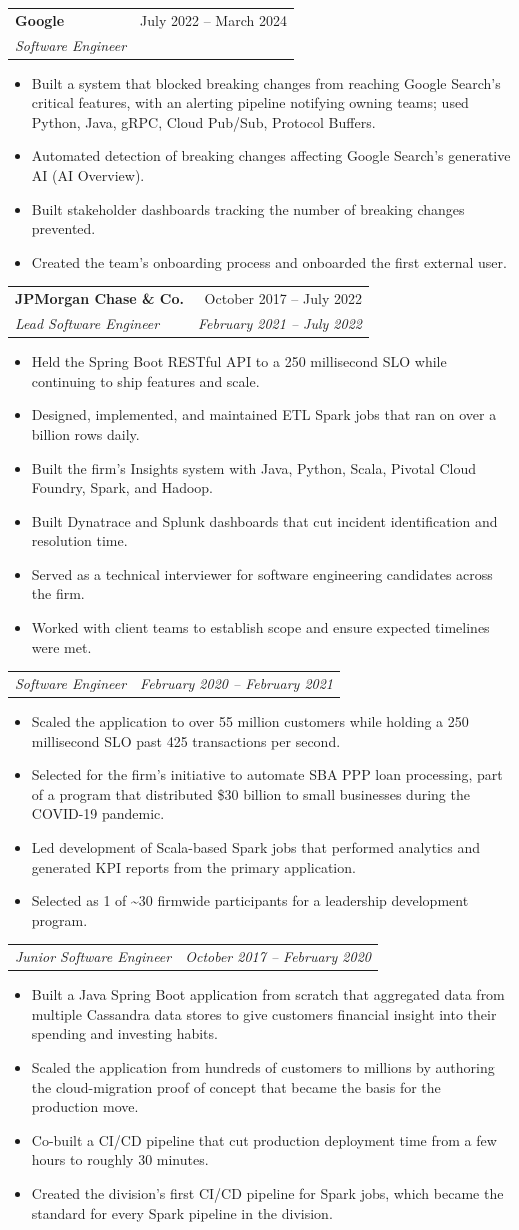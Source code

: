 \documentclass[letterpaper,10pt]{article}
\makeatletter
\newcommand{\resumeItem}[1]{
  \item\small{#1}
}
\newcommand{\resumeSubheading}[4]{
  \needspace{5\baselineskip}\vspace{4pt}\item
    \begin{tabular*}{0.97\textwidth}[t]{l@{\extracolsep{\fill}}r}
      \textbf{#1} & #2 \\
      \textit{\small#3} & \textit{\small #4} \\
    \end{tabular*}\vspace{-3pt}
}
\newcommand{\resumeSubheadingStacked}[4]{
  \needspace{5\baselineskip}\vspace{4pt}\item
    \begin{tabular*}{0.97\textwidth}[t]{l@{\extracolsep{\fill}}r}
      \textbf{#1} & #2 \\[4pt]
      \textit{\small#3} & \textit{\small #4} \\
    \end{tabular*}\vspace{-3pt}
}
\newcommand{\resumeSubSubheading}[2]{
    \needspace{4\baselineskip}\vspace{5pt}\item
    \begin{tabular*}{0.97\textwidth}{l@{\extracolsep{\fill}}r}
      \textit{\small#1} & \textit{\small #2} \\
    \end{tabular*}\vspace{-3pt}
}
\newcommand{\resumeItemListStart}{\begin{itemize}[leftmargin=*, itemsep=3pt, topsep=3pt, parsep=0pt, partopsep=0pt]}
\newcommand{\resumeItemListEnd}{\end{itemize}}
\makeatother
\begin{document}
    \resumeSubheading
      {Google}{July 2022 -- March 2024}
      {Software Engineer}{}
      \resumeItemListStart
        \resumeItem{Built a system that blocked breaking changes from reaching Google Search's critical features, with an alerting pipeline notifying owning teams; used Python, Java, gRPC, Cloud Pub/Sub, Protocol Buffers.}
        \resumeItem{Automated detection of breaking changes affecting Google Search's generative AI (AI Overview).}
        \resumeItem{Built stakeholder dashboards tracking the number of breaking changes prevented.}
        \resumeItem{Created the team's onboarding process and onboarded the first external user.}
      \resumeItemListEnd

    \resumeSubheadingStacked
      {JPMorgan Chase \& Co.}{October 2017 -- July 2022}
      {Lead Software Engineer}{February 2021 -- July 2022}
      \resumeItemListStart
        \resumeItem{Held the Spring Boot RESTful API to a 250 millisecond SLO while continuing to ship features and scale.}
        \resumeItem{Designed, implemented, and maintained ETL Spark jobs that ran on over a billion rows daily.}
        \resumeItem{Built the firm's Insights system with Java, Python, Scala, Pivotal Cloud Foundry, Spark, and Hadoop.}
        \resumeItem{Built Dynatrace and Splunk dashboards that cut incident identification and resolution time.}
        \resumeItem{Served as a technical interviewer for software engineering candidates across the firm.}
        \resumeItem{Worked with client teams to establish scope and ensure expected timelines were met.}
      \resumeItemListEnd

      \resumeSubSubheading
        {Software Engineer}{February 2020 -- February 2021}
      \resumeItemListStart
        \resumeItem{Scaled the application to over 55 million customers while holding a 250 millisecond SLO past 425 transactions per second.}
        \resumeItem{Selected for the firm's initiative to automate SBA PPP loan processing, part of a program that distributed \$30 billion to small businesses during the COVID-19 pandemic.}
        \resumeItem{Led development of Scala-based Spark jobs that performed analytics and generated KPI reports from the primary application.}
        \resumeItem{Selected as 1 of \textasciitilde30 firmwide participants for a leadership development program.}
      \resumeItemListEnd

      \resumeSubSubheading
        {Junior Software Engineer}{October 2017 -- February 2020}
      \resumeItemListStart
        \resumeItem{Built a Java Spring Boot application from scratch that aggregated data from multiple Cassandra data stores to give customers financial insight into their spending and investing habits.}
        \resumeItem{Scaled the application from hundreds of customers to millions by authoring the cloud-migration proof of concept that became the basis for the production move.}
        \resumeItem{Co-built a CI/CD pipeline that cut production deployment time from a few hours to roughly 30 minutes.}
        \resumeItem{Created the division's first CI/CD pipeline for Spark jobs, which became the standard for every Spark pipeline in the division.}
      \resumeItemListEnd
\end{document}
